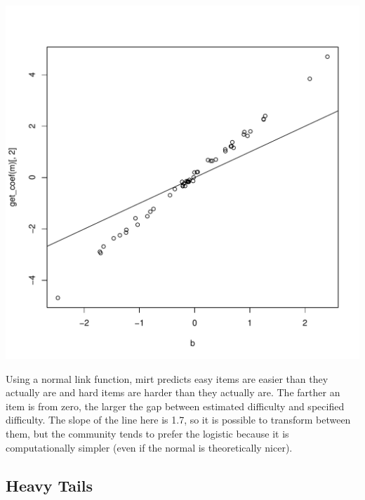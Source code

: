 \documentclass{article}\usepackage[]{graphicx}\usepackage[]{color}
\makeatletter
\def\maxwidth{ %
  \ifdim\Gin@nat@width>\linewidth
    \linewidth
  \else
    \Gin@nat@width
  \fi
}
\newenvironment{knitrout}{}{} %
\makeatother
\begin{document}
\begin{knitrout}
\color{fgcolor}
\includegraphics[width=\maxwidth]{figure/unnamed-chunk-6-1} 

\end{knitrout}

Using a normal link function, mirt predicts easy items are easier than they actually are and hard items are harder than they actually are.  The farther an item is from zero, the larger the gap between estimated difficulty and specified difficulty.  The slope of the line here is 1.7, so it is possible to transform between them, but the community tends to prefer the logistic because it is computationally simpler (even if the normal is theoretically nicer).

\pagebreak
\subsection{Heavy Tails}
\end{document}
